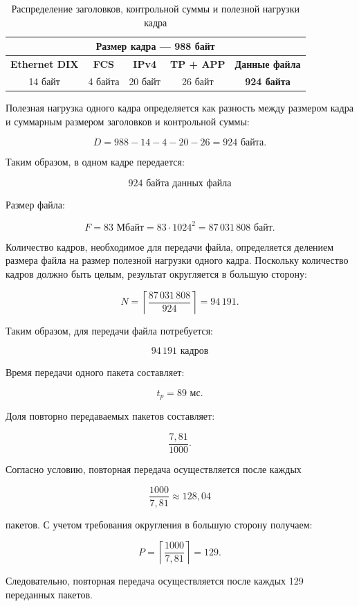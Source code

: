 \begin{table}[H]
\centering
\begin{tabular}{|c|c|c|c|c|}
\hline
\multicolumn{5}{|c|}{\textbf{Размер кадра --- 988 байт}} \\ \hline
\textbf{Ethernet DIX} &
\textbf{FCS} &
\textbf{IPv4} &
\textbf{TP + APP} &
\textbf{Данные файла} \\ \hline
14 байт &
4 байта &
20 байт &
26 байт &
\textbf{924 байта} \\ \hline
\end{tabular}
\caption{Распределение заголовков, контрольной суммы и полезной нагрузки кадра}
\label{tab:packet_structure}
\end{table}

Полезная нагрузка одного кадра определяется как разность между
размером кадра и суммарным размером заголовков и контрольной суммы:

\[
D=988-14-4-20-26=924\text{ байта}.
\]

Таким образом, в одном кадре передается:

\[
\boxed{924\text{ байта данных файла}}
\]

Размер файла:

\[
F=83\text{ Мбайт}
=83\cdot1024^2
=87\,031\,808\text{ байт}.
\]

Количество кадров, необходимое для передачи файла, определяется
делением размера файла на размер полезной нагрузки одного кадра.
Поскольку количество кадров должно быть целым, результат
округляется в большую сторону:

\[
N=
\left\lceil
\frac{87\,031\,808}{924}
\right\rceil
=
94\,191.
\]

Таким образом, для передачи файла потребуется:

\[
\boxed{94\,191\text{ кадров}}
\]

Время передачи одного пакета составляет:

\[
t_p=89\text{ мс}.
\]

Доля повторно передаваемых пакетов составляет:

\[
\frac{7{,}81}{1000}.
\]

Согласно условию, повторная передача осуществляется после каждых

\[
\frac{1000}{7{,}81}\approx128{,}04
\]

пакетов. С учетом требования округления в большую сторону получаем:

\[
P=
\left\lceil
\frac{1000}{7{,}81}
\right\rceil
=129.
\]

Следовательно, повторная передача осуществляется после каждых
129 переданных пакетов.

